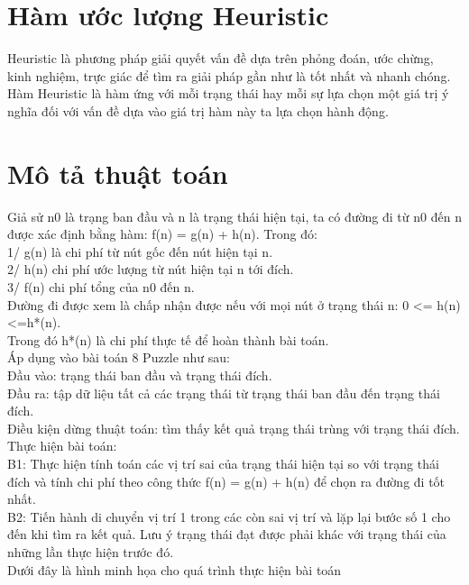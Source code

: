 \section{Hàm ước lượng Heuristic}
Heuristic là phương pháp giải quyết vấn đề dựa trên phỏng đoán, ước chừng, kinh nghiệm, trực giác để tìm ra giải pháp gần như là tốt nhất và nhanh chóng.\\
Hàm Heuristic là hàm ứng với mỗi trạng thái hay mỗi sự lựa chọn một giá trị ý nghĩa đối với vấn đề dựa vào giá trị hàm này ta lựa chọn hành động.

\section{Mô tả thuật toán}
 Giả sử n0 là trạng ban đầu và n là trạng thái hiện tại, ta có đường đi từ n0 đến n được xác định bằng hàm: f(n) = g(n) + h(n). Trong đó:\\
1/ g(n) là chi phí từ nút gốc đến nút hiện tại n.\\
2/ h(n) chi phí ước lượng từ nút hiện tại n tới đích.\\
3/ f(n) chi phí tổng của n0 đến n.\\

Đường đi được xem là chấp nhận được nếu với mọi nút ở trạng thái n: 0 <= h(n) <=h*(n).\\
Trong đó h*(n) là chi phí thực tế để hoàn thành bài toán.\\

Áp dụng vào bài toán 8 Puzzle như sau:\\
Đầu vào: trạng thái ban đầu và trạng thái đích.\\
Đầu ra: tập dữ liệu tất cả các trạng thái từ trạng thái ban đầu đến trạng thái đích.\\
Điều kiện dừng thuật toán: tìm thấy kết quả trạng thái trùng với trạng thái đích.\\

Thực hiện bài toán: \\
B1: Thực hiện tính toán các vị trí sai của trạng thái hiện tại so với trạng thái đích và tính chi phí theo công thức f(n) = g(n) + h(n) để chọn ra đường đi tốt nhất. \\
B2: Tiến hành di chuyển vị trí 1 trong các còn sai vị trí và lặp lại bước số 1 cho đến khi tìm ra kết quả. Lưu ý trạng thái đạt được phải khác với trạng thái của những lần thực hiện trước đó.\\

Dưới đây là hình minh họa cho quá trình thực hiện bài toán\\

